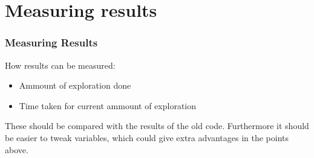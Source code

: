 \documentclass{beamer}
\newcommand{\slide}[2]
{
\begin{frame}
\frametitle{#1} 

#2

\end{frame}
}
\begin{document}
\section{Measuring results}
\slide{Measuring Results}
{
    How results can be measured:
    \begin{itemize}
        \item Ammount of exploration done
        \item Time taken for current ammount of exploration
    \end{itemize}
    These should be compared with the results of the old code. Furthermore it
    should be easier to tweak variables, which could give extra advantages in
    the points above.
}
\end{document}
